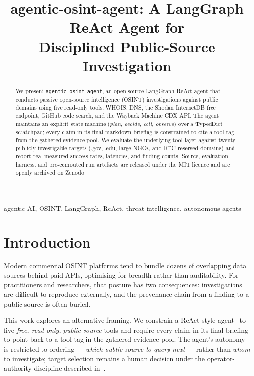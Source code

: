 \documentclass[conference]{IEEEtran}
\title{agentic-osint-agent: A LangGraph ReAct Agent for\\Disciplined Public-Source Investigation}
\author{
\IEEEauthorblockN{Ali Murtaza Bhutto}
\IEEEauthorblockA{Independent Researcher\\
ORCID: 0009-0007-2787-943X\\
\href{https://github.com/thunderstornX/agentic-osint-agent}{github.com/thunderstornX/agentic-osint-agent}}
}
\begin{document}
\maketitle

\begin{abstract}
We present \texttt{agentic-osint-agent}, an open-source LangGraph ReAct
agent that conducts passive open-source intelligence (OSINT)
investigations against public domains using five read-only tools: WHOIS,
DNS, the Shodan InternetDB free endpoint, GitHub code search, and the
Wayback Machine CDX API. The agent maintains an explicit state machine
(\emph{plan}, \emph{decide}, \emph{call}, \emph{observe}) over a
TypedDict scratchpad; every claim in its final markdown briefing is
constrained to cite a tool tag from the gathered evidence pool. We
evaluate the underlying tool layer against twenty publicly-investigable
targets (.gov, .edu, large NGOs, and RFC-reserved domains) and report
real measured success rates, latencies, and finding counts. Source,
evaluation harness, and pre-computed run artefacts are released under
the MIT licence and are openly archived on Zenodo.
\end{abstract}

\begin{IEEEkeywords}
agentic AI, OSINT, LangGraph, ReAct, threat intelligence, autonomous agents
\end{IEEEkeywords}

\section{Introduction}
\label{sec:intro}
Modern commercial OSINT platforms tend to bundle dozens of overlapping
data sources behind paid APIs, optimising for breadth rather than
auditability. For practitioners and researchers, that posture has two
consequences: investigations are difficult to reproduce externally, and
the provenance chain from a finding to a public source is often
buried.

This work explores an alternative framing. We constrain a ReAct-style
agent~\cite{yao2023react} to five \emph{free, read-only, public-source}
tools and require every claim in its final briefing to point back to a
tool tag in the gathered evidence pool. The agent's autonomy is
restricted to ordering — \emph{which public source to query next} —
rather than \emph{whom} to investigate; target selection remains a
human decision under the operator-authority discipline described
in~\cite{bhutto2025osintlegal}.
\end{document}
